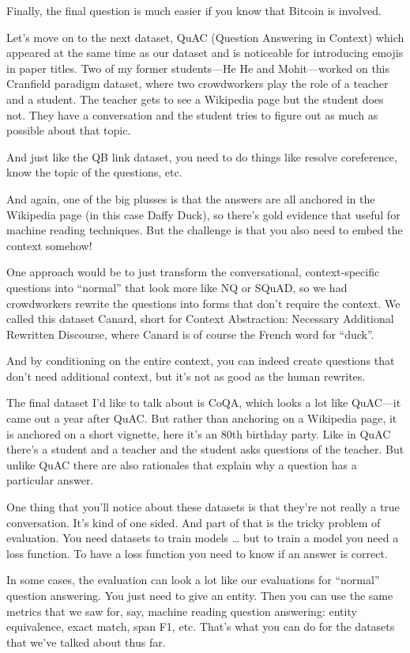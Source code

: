 Finally, the final question is much easier if you know that Bitcoin is involved.

Let’s move on to the next dataset, QuAC (Question Answering in Context) which appeared at the same time as our dataset and is noticeable for introducing emojis in paper titles.  Two of my former students—He He and Mohit—worked on this Cranfield paradigm dataset, where two crowdworkers play the role of a teacher and a student.  The teacher gets to see a Wikipedia page but the student does not.  They have a conversation and the student tries to figure out as much as possible about that topic.  

And just like the QB link dataset, you need to do things like resolve coreference, know the topic of the questions, etc.

And again, one of the big plusses is that the answers are all anchored in the Wikipedia page (in this case Daffy Duck), so there’s gold evidence that useful for machine reading techniques.  But the challenge is that you also need to embed the context somehow!

One approach would be to just transform the conversational, context-specific questions into “normal” that look more like NQ or SQuAD, so we had crowdworkers rewrite the questions into forms that don’t require the context.  We called this dataset Canard, short for Context Abstraction: Necessary Additional Rewritten Discourse, where Canard is of course the French word for “duck”.

And by conditioning on the entire context, you can indeed create questions that don’t need additional context, but it’s not as good as the human rewrites.

The final dataset I’d like to talk about is CoQA, which looks a lot like QuAC—it came out a year after QuAC.  But rather than anchoring on a Wikipedia page, it is anchored on a short vignette, here it’s an 80th birthday party.  Like in QuAC there’s a student and a teacher and the student asks questions of the teacher.  But unlike QuAC there are also rationales that explain why a question has a particular answer.

One thing that you’ll notice about these datasets is that they’re not really a true conversation.  It’s kind of one sided.  And part of that is the tricky problem of evaluation.  You need datasets to train models … but to train a model you need a loss function.  To have a loss function you need to know if an answer is correct.  

In some cases, the evaluation can look a lot like our evaluations for “normal” question answering.  You just need to give an entity.  Then you can use the same metrics that we saw for, say, machine reading question answering: entity equivalence, exact match, span F1, etc.  That’s what you can do for the datasets that we’ve talked about thus far.


